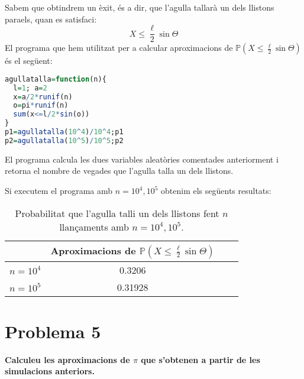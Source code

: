 \documentclass[11pt,a4paper]{article}
\begin{document}
Sabem que obtindrem un èxit, és a dir, que l'agulla tallarà un dels llistons para\lgem els, quan es satisfaci: $$X\leq \frac{\ell}{2}\sin\Theta$$
El programa que hem utilitzat per a calcular aproximacions de $\mathbb{P}(X\leq \frac{\ell}{2}\sin\Theta)$ és el següent:
\begin{lstlisting}[language=R, caption={Programa del problema 4},xleftmargin=.25\textwidth,xrightmargin=.25\textwidth]
agullatalla=function(n){
  l=1; a=2
  x=a/2*runif(n)
  o=pi*runif(n)
  sum(x<=l/2*sin(o))
}
p1=agullatalla(10^4)/10^4;p1
p2=agullatalla(10^5)/10^5;p2
\end{lstlisting}
El programa calcula les dues variables aleatòries comentades anteriorment i retorna el nombre de vegades que l'agulla talla un dels llistons.

Si executem el programa amb $n=10^4,10^5$ obtenim els següents resultats:
\begin{table}[ht]
  \centering
  \begin{tabular}{|c|c|c|c|}
    \hline
             & Aproximacions de $\mathbb{P}(X\leq \frac{\ell}{2}\sin\Theta)$ \\
    \hline
    $n=10^4$ & 0.3206                                                        \\
    \hline
    $n=10^5$ & 0.31928                                                       \\
    \hline
  \end{tabular}
  \caption{Probabilitat que l'agulla talli un dels llistons fent $n$ llançaments amb $n=10^4,10^5$.}
\end{table}
\section*{Problema 5}
\textbf{Calculeu les aproximacions de $\pi$ que s’obtenen a partir de les simulacions anteriors.}
\end{document}
